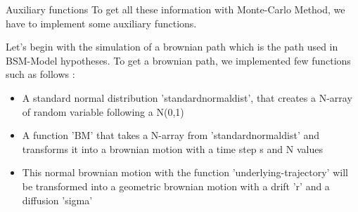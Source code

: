 \documentclass{beamer}
\begin{document}
\begin{frame}{Auxiliary functions}
To get all these information with Monte-Carlo Method, we have to implement some auxiliary functions.

Let's begin with the simulation of a brownian path which is the path used in BSM-Model hypotheses. To get a brownian path, we implemented few functions such as follows :


\begin{itemize}
    \item 
        A standard normal distribution 'standardnormaldist', that creates a N-array of random variable following a N(0,1)   
        
     \end{itemize}
     
\vspace{2mm}   

\begin{itemize}
    \item 
        A function 'BM' that takes a N-array from 'standardnormaldist' and transforms it into a brownian motion with a time step s and N values
        
     \end{itemize}
     
 \begin{itemize}
    \item 
        This normal brownian motion with the function 'underlying-trajectory' will be transformed into a geometric brownian motion with a drift 'r' and a diffusion 'sigma'
        
     \end{itemize} 
\end{frame}
\end{document}
